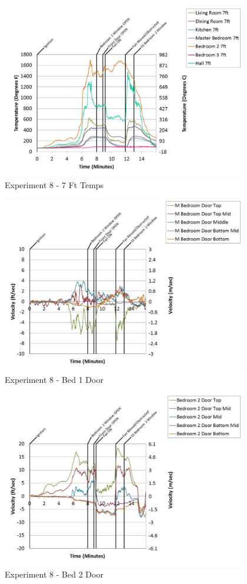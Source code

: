\documentclass{article}
\begin{document}
\begin{appendices}
	\begin{figure}[h!]
		\centering
		\includegraphics[height=3.05in]{0_Images/Results_Charts/Exp_8_Charts/7FtTemps.pdf}
		\caption{Experiment 8 - 7 Ft Temps}
	\end{figure}
 
	\clearpage

	\begin{figure}[h!]
		\centering
		\includegraphics[height=3.05in]{0_Images/Results_Charts/Exp_8_Charts/Bed1Door.pdf}
		\caption{Experiment 8 - Bed 1 Door}
	\end{figure}
 

	\begin{figure}[h!]
		\centering
		\includegraphics[height=3.05in]{0_Images/Results_Charts/Exp_8_Charts/Bed2Door.pdf}
		\caption{Experiment 8 - Bed 2 Door}
	\end{figure}
 

\end{appendices}
\end{document}
